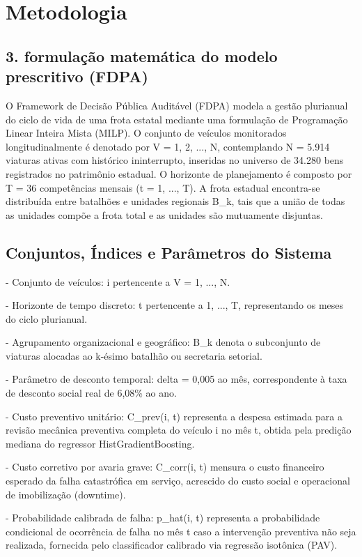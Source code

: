 \documentclass[12pt,a4paper]{article}
\begin{document}
\section{Metodologia}


\subsection{3. formulação matemática do modelo prescritivo (FDPA)}

O Framework de Decisão Pública Auditável (FDPA) modela a gestão plurianual do ciclo de vida de uma frota estatal mediante uma formulação de Programação Linear Inteira Mista (MILP). O conjunto de veículos monitorados longitudinalmente é denotado por V = {1, 2, ..., N}, contemplando N = 5.914 viaturas ativas com histórico ininterrupto, inseridas no universo de 34.280 bens registrados no patrimônio estadual. O horizonte de planejamento é composto por T = 36 competências mensais (t = 1, ..., T). A frota estadual encontra-se distribuída entre batalhões e unidades regionais B\_k, tais que a união de todas as unidades compõe a frota total e as unidades são mutuamente disjuntas.


\subsection{Conjuntos, Índices e Parâmetros do Sistema}

- Conjunto de veículos: i pertencente a V = {1, ..., N}.

- Horizonte de tempo discreto: t pertencente a {1, ..., T}, representando os meses do ciclo plurianual.

- Agrupamento organizacional e geográfico: B\_k denota o subconjunto de viaturas alocadas ao k-ésimo batalhão ou secretaria setorial.

- Parâmetro de desconto temporal: delta = 0,005 ao mês, correspondente à taxa de desconto social real de 6,08\% ao ano.

- Custo preventivo unitário: C\_prev(i, t) representa a despesa estimada para a revisão mecânica preventiva completa do veículo i no mês t, obtida pela predição mediana do regressor HistGradientBoosting.

- Custo corretivo por avaria grave: C\_corr(i, t) mensura o custo financeiro esperado da falha catastrófica em serviço, acrescido do custo social e operacional de imobilização (downtime).

- Probabilidade calibrada de falha: p\_hat(i, t) representa a probabilidade condicional de ocorrência de falha no mês t caso a intervenção preventiva não seja realizada, fornecida pelo classificador calibrado via regressão isotônica (PAV).
\end{document}
